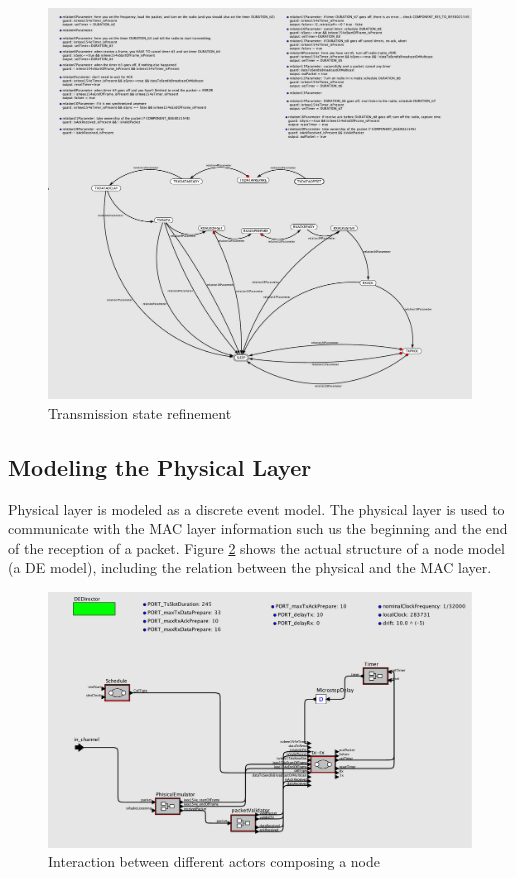 \begin{figure}
  \centering
  \includegraphics[width=\textwidth]{figures/TransmissionFSM.pdf}
  \caption{Transmission state refinement}
  \label{fig:tx}
\end{figure}

\subsection{Modeling the Physical Layer}
\label{sec:modeling-physical-layer}
Physical layer is modeled as a discrete event model. The physical layer is used to communicate with the MAC layer information such us the beginning and the end of the reception of a packet. Figure \ref{fig:node} shows the actual structure of a node model (a DE model), including the relation between the physical and the MAC layer.

\begin{figure}
  \centering
  \includegraphics[width=\textwidth]{figures/WirelessNode.pdf}
  \caption{Interaction between different actors composing a node}
  \label{fig:node}
\end{figure}


